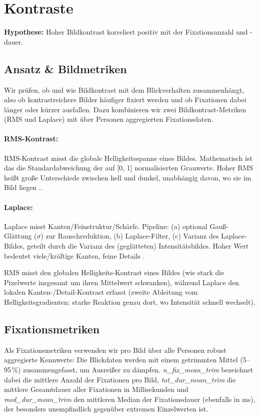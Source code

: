 \documentclass[
    language=german, %
    thesis=seminar, %
    supervisor=postdoc, %
    multiauthor=true, %
    ]{settings/csssa-thesis}
\begin{document}
\section{Kontraste}

\textbf{Hypothese:} Hoher Bildkontrast korreliert positiv mit der Fixationsanzahl und -dauer. 

\subsection{Ansatz \& Bildmetriken}
Wir prüfen, ob und wie Bildkontrast mit dem Blickverhalten zusammenhängt, 
also ob kontrastreichere Bilder häufiger fixiert werden und ob Fixationen dabei länger oder kürzer ausfallen. 
Dazu kombinieren wir zwei Bildkontrast-Metriken (RMS und Laplace) mit über Personen aggregierten Fixationsdaten.

\paragraph{RMS-Kontrast:} 
RMS-Kontrast misst die globale Helligkeitsspanne eines Bildes. Mathematisch ist das die Standardabweichung der auf [0, 1] normalisierten Grauwerte. 
Hoher RMS hei{\ss}t gro{\ss}e Unterschiede zwischen hell und dunkel, unabhängig davon, wo sie im Bild liegen \cite{Kukkonen1993}.. 

\paragraph{Laplace:}
Laplace misst Kanten/Feinstruktur/Schärfe. Pipeline: (a) optional Gau{\ss}-Glättung ($\sigma$) zur Rauschreduktion, (b) Laplace-Filter, (c) Varianz des Laplace-Bildes, 
geteilt durch die Varianz des (geglätteten) Intensitätsbildes. Hoher Wert bedeutet viele/kräftige Kanten, feine Details \citep{Starnes2023}. 

RMS misst den globalen Helligkeits-Kontrast eines Bildes (wie stark die Pixelwerte insgesamt um ihren Mittelwert schwanken),
während Laplace den lokalen Kanten-/Detail-Kontrast erfasst (zweite Ableitung vom Helligkeitsgradienten: starke Reaktion genau dort, wo Intensität schnell wechselt).

\subsection{Fixationsmetriken}
Als Fixationsmetriken verwenden wir pro Bild über alle Personen robust aggregierte Kennwerte: Die Blickdaten werden mit einem getrimmten Mittel (5–95\,\%) zusammengefasst, um Ausrei{\ss}er zu dämpfen. 
\textit{n\_fix\_mean\_trim} bezeichnet dabei die mittlere Anzahl der Fixationen pro Bild, \textit{tot\_dur\_mean\_trim} die mittlere Gesamtdauer aller Fixationen in Millisekunden und \textit{med\_dur\_mean\_trim} den mittleren Median der Fixationsdauer (ebenfalls in ms), 
der besonders unempfindlich gegenüber extremen Einzelwerten ist.
\end{document}
